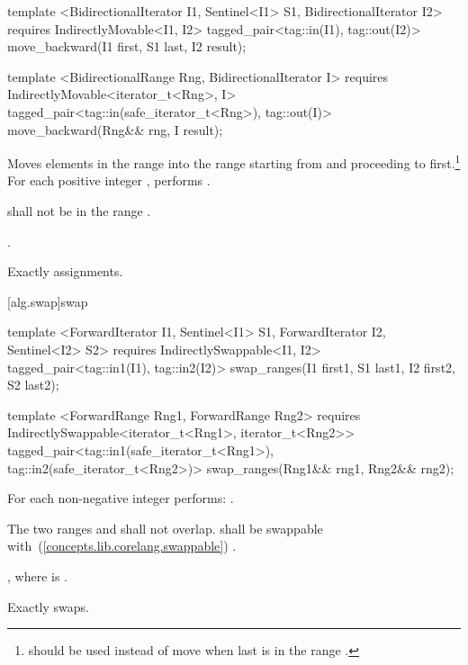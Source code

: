%
\begin{itemdecl}
template <BidirectionalIterator I1, Sentinel<I1> S1, BidirectionalIterator I2>
  requires IndirectlyMovable<I1, I2>
  tagged_pair<tag::in(I1), tag::out(I2)>
    move_backward(I1 first, S1 last, I2 result);

template <BidirectionalRange Rng, BidirectionalIterator I>
  requires IndirectlyMovable<iterator_t<Rng>, I>
  tagged_pair<tag::in(safe_iterator_t<Rng>), tag::out(I)>
    move_backward(Rng&& rng, I result);
\end{itemdecl}

\begin{itemdescr}
\pnum
\effects
Moves elements in the range 
into the
range 
starting from
and proceeding to first.\footnote{
should be used instead of move when last
is in
the range
.}
For each positive integer
,
performs
.

\pnum
\requires
{}
shall not be in the range
.

\pnum
\returns
{}.

\pnum
\complexity
Exactly
assignments.
\end{itemdescr}

[alg.swap]{swap}

%
\begin{itemdecl}
template <ForwardIterator I1, Sentinel<I1> S1, ForwardIterator I2, Sentinel<I2> S2>
  requires IndirectlySwappable<I1, I2>
  tagged_pair<tag::in1(I1), tag::in2(I2)>
    swap_ranges(I1 first1, S1 last1, I2 first2, S2 last2);

template <ForwardRange Rng1, ForwardRange Rng2>
  requires IndirectlySwappable<iterator_t<Rng1>, iterator_t<Rng2>>
  tagged_pair<tag::in1(safe_iterator_t<Rng1>), tag::in2(safe_iterator_t<Rng2>)>
    swap_ranges(Rng1&& rng1, Rng2&& rng2);
\end{itemdecl}

\begin{itemdescr}
\pnum
\effects
For each non-negative integer 
performs:
.

\pnum
\requires
The two ranges 
and
shall not overlap.
 shall be swappable with~(\ref{concepts.lib.corelang.swappable})
.

\pnum
\returns
{}, where
 is .

\pnum
\complexity
Exactly
swaps.
\end{itemdescr}

